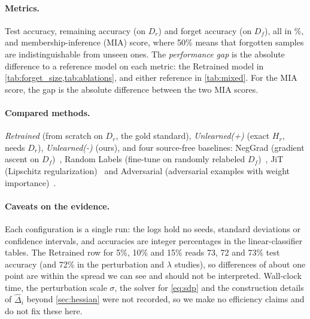 \documentclass[10pt,twocolumn,letterpaper]{article}
\begin{document}
\paragraph{Metrics.}
Test accuracy, remaining accuracy (on $D_r$) and forget accuracy (on $D_f$), all in \%, and membership-inference (MIA) score, where 50\% means that forgotten samples are indistinguishable from unseen ones.
The \emph{performance gap} is the absolute difference to a reference model on each metric: the Retrained model in \cref{tab:forget_size,tab:ablations}, and either reference in \cref{tab:mixed}.
For the MIA score, the gap is the absolute difference between the two MIA scores.

\paragraph{Compared methods.}
\emph{Retrained} (from scratch on $D_r$, the gold standard), \emph{Unlearned(+)} (exact $H_r$, needs $D_r$), \emph{Unlearned(-)} (ours), and four source-free baselines: NegGrad (gradient ascent on $D_f$)~\cite{golatkar2020eternal,kurmanji2023}, Random Labels (fine-tune on randomly relabeled $D_f$)~\cite{graves2021}, JiT (Lipschitz regularization)~\cite{foster2024jit} and Adversarial (adversarial examples with weight importance)~\cite{cha2024}.

\paragraph{Caveats on the evidence.}
Each configuration is a single run: the logs hold no seeds, standard deviations or confidence intervals, and accuracies are integer percentages in the linear-classifier tables.
The Retrained row for 5\%, 10\% and 15\% reads 73, 72 and 73\% test accuracy (and 72\% in the perturbation and $\lambda$ studies), so differences of about one point are within the spread we can see and should not be interpreted.
Wall-clock time, the perturbation scale $\sigma$, the solver for \cref{eq:sdp} and the construction details of $\widehat\Delta_i$ beyond \cref{sec:hessian} were not recorded, so we make no efficiency claims and do not fix these here.
\end{document}
